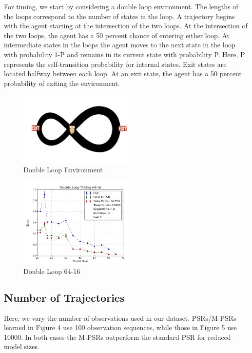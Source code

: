 For timing, we start by considering a double loop environment. The lengths of the loops correspond to the number of states in the loop. A trajectory begins with the agent starting at the intersection of the two loops. At the intersection of the two loops, the agent has a 50 percent chance of entering either loop. At intermediate states in the loops the agent moves to the next state in the loop with probability 1-P and remains in its current state with probability P. Here, P represents the self-transition probability for internal states. Exit states are located halfway between each loop. At an exit state, the agent has a 50 percent probability of exiting the environment. 

\begin{figure}[ht!]
\centering
\includegraphics[width=60mm]{uCOREPICS/DL/doubleLoopImage.png}
\caption{Double Loop Environment\label{overflow}}
\end{figure}

\begin{figure}[ht!]
\centering
\includegraphics[width=60mm]{uCOREPICS/DL/64-16-10000.png}
\caption{Double Loop 64-16\label{overflow}}
\end{figure}

\subsection{Number of Trajectories}

Here, we vary the number of observations used in our dataset. PSRs/M-PSRs learned in Figure 4 use 100 observation sequences, while those in Figure 5 use 10000. In both cases the M-PSRs outperform the standard PSR for reduced model sizes.

